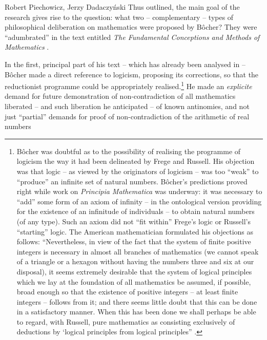 \begin{artengenv}{Robert Piechowicz, Jerzy Dadaczyński}
Thus outlined, the main goal of the research gives rise to the question: what two -- complementary -- types of philosophical deliberation on mathematics were proposed by Bôcher? They were ``adumbrated'' in the text entitled \textit{The Fundamental Conceptions and Methods of Mathematics}
\parencite[][]{bocher_fundamental_1904}.


In the first, principal part of his text -- which has already been analysed in
\parencite[][]{dadaczynski_tendencje_2015} -- Bôcher made a direct reference to logicism, proposing its corrections, so that the reductionist programme could be appropriately realised.\footnote{Bôcher was doubtful as to the possibility of realising the programme of logicism the way it had been delineated by Frege and Russell. His objection was that logic -- as viewed by the originators of logicism -- was too ``weak'' to ``produce'' an infinite set of natural numbers. Bôcher's predictions proved right while work on \textit{Principia Mathematica} was underway: it was necessary to ``add'' some form of an axiom of infinity -- in the ontological version providing for the existence of an infinitude of individuals -- to obtain natural numbers (of any type). Such an axiom did not ``fit within'' Frege's logic or Russell's ``starting'' logic. The American mathematician formulated his objections as follows: ``Nevertheless, in view of the fact that the system of finite positive integers is necessary in almost all branches of mathematics (we cannot speak of a triangle or a hexagon without having the numbers three and six at our disposal), it seems extremely desirable that the system of logical principles which we lay at the foundation of all mathematics be assumed, if possible, broad enough so that the existence of positive integers -- at least finite integers -- follows from it; and there seems little doubt that this can be done in a satisfactory manner. When this has been done we shall perhaps be able to regard, with Russell, pure mathematics as consisting exclusively of deductions by ‘logical principles from logical principles'' 
\parencite[][p.132]{bocher_fundamental_1904}.%
} He made an \textit{explicite} demand for future demonstration of non-contradiction of all mathematics liberated -- and such liberation he anticipated -- of known antinomies, and not just ``partial'' demands for proof of non-contradiction of the arithmetic of real numbers 

\end{artengenv}
